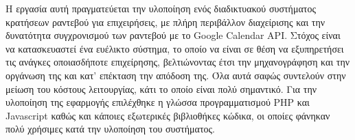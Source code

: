 
\Titlepage
\Declarationpage

\begin{Abstract}
Η εργασία αυτή πραγματεύεται την υλοποίηση ενός διαδικτυακού συστήματος κρατήσεων ραντεβού για επιχειρήσεις, με πλήρη περιβάλλον διαχείρισης και την δυνατότητα συγχρονισμού των ραντεβού με το Google Calendar API. Στόχος είναι να κατασκευαστεί ένα ευέλικτο σύστημα, το οποίο να είναι σε θέση να εξυπηρετήσει τις ανάγκες οποιασδήποτε επιχείρησης, βελτιώνοντας έτσι την μηχανογράφηση και την οργάνωση της και κατ' επέκταση την απόδοση της. Όλα αυτά σαφώς συντελούν στην μείωση του κόστους λειτουργίας, κάτι το οποίο είναι πολύ σημαντικό. Για την υλοποίηση της εφαρμογής επιλέχθηκε η γλώσσα προγραμματισμού PHP και Javascript καθώς και κάποιες εξωτερικές βιβλιοθήκες κώδικα, οι οποίες φάνηκαν πολύ χρήσιμες κατά την υλοποίηση του συστήματος.
\end{Abstract}

\tableofcontents
\listoffigures

